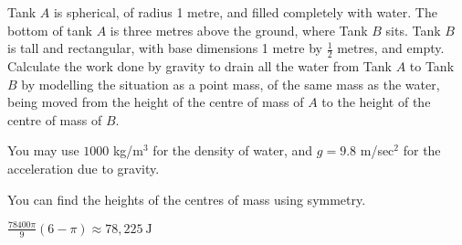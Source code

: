 \begin{question}\label{prob_s2.3tank1}
Tank $A$ is spherical, of radius 1 metre, and filled completely with water. The bottom of tank $A$ is three metres above the ground, where Tank $B$ sits. Tank $B$ is tall and rectangular, with base dimensions 1 metre by $\frac{1}{2}$ metres, and empty. Calculate the work done by gravity to drain all the water from Tank $A$ to Tank $B$ by modelling the situation as a point mass, of the same mass as the water, being moved from the height of the centre of mass of $A$ to the height of the centre of mass of $B$.

\begin{center}
\end{center}
You may use $1000$ kg/m$^3$ for the density of water, and $g=9.8$ m/sec$^2$ for the acceleration due to gravity.
\end{question}
\begin{hint}
You can find the heights of the centres of mass using symmetry.
\end{hint}
\begin{answer}
$\displaystyle\frac{78400\pi}{9}(6-\pi)\approx 78,225~\text{J}$
\end{answer}
